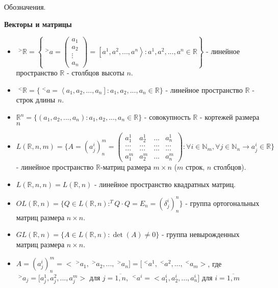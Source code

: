 \documentclass[__main__.tex]{subfiles}
\begin{document}
Обозначения.

\textbf{Векторы и матрицы}

\begin{itemize}
  \item
        $\;^{>}\mathbb{R} = \left\{ \;^{>}a =
          \left(
          \begin{matrix}
              a_1    \\
              a_2    \\
              \vdots \\
              a_n
            \end{matrix}
          \right)
          = \left[a^1,a^2, ... ,a^n\right> : a^1, a^2, ... , a^n \in \mathbb{R}
          \right\}$ - линейное пространство $\mathbb{R}$ - столбцов высоты $n$.

  \item
        $\;^{<}\mathbb{R} = \lbrace \;^{<}a = \left< a_1,a_2, ... , a_n \right] : a_1, a_2, ... , a_n \in \mathbb{R}
          \rbrace$ - линейное пространство $\mathbb{R}$ - строк длины $n$.

  \item
        $\mathbb{R}^n = \lbrace (a_1, a_2, ... , a_n): a_1, a_2, ... , a_n \in \mathbb{R} \rbrace$ - совокупность $\mathbb{R}$ - кортежей размера $n$

  \item
        $L(\mathbb{R}, n, m) = \lbrace A = (a^i_j)^m_n = \left(
          \begin{matrix}
              a^1_1 & a^1_2 & ... & a^1_n \\
              ...   & ...   & ... & ...   \\
              ...   & ...   & ... & ...   \\
              a^m_1 & a^m_2 & ... & a^m_n
            \end{matrix}
          \right): \forall i \in \mathbb{N}_m, \forall j \in \mathbb{N}_n \rightarrow a_j^i \in \mathbb{R} \rbrace$ - линейное пространство $\mathbb{R}$-матриц размера $m \times n$ ($m$ строк, $n$ столбцов).

  \item
        $L (\mathbb{R},n,n) = L (\mathbb{R},n)$ - линейное пространство квадратных матриц.

  \item
        $OL(\mathbb{R},n) = \lbrace Q \in L(\mathbb{R},n): ^{T}Q \cdot Q = E_n = (\delta ^i_j)^n_n \rbrace$ - группа ортогональных матриц размера $n \times n$.

  \item
        $GL(\mathbb{R},n) = \lbrace A \in L(\mathbb{R},n): \det (A) \neq 0 \rbrace$ - группа невырожденных матриц размера $n \times n$.

  \item
        $A = (a^i_j)^m_n = < \;^{>}a_1, \;^{>}a_2, ... , \;^{>}a_n] = [\;^{<}a^1, \;^{<}a^2, ... , \;^{<}a_m >$, где $\;^{>}a_j = [a^1_j, a^2_j, ... , a^m_j >$ для $j = \overline{1,n}$, $\;^{<}a^i = < a^i_1, a^i_2, ... , a^i_n]$ для $i = \overline{1,m}$
\end{itemize}
\end{document}
